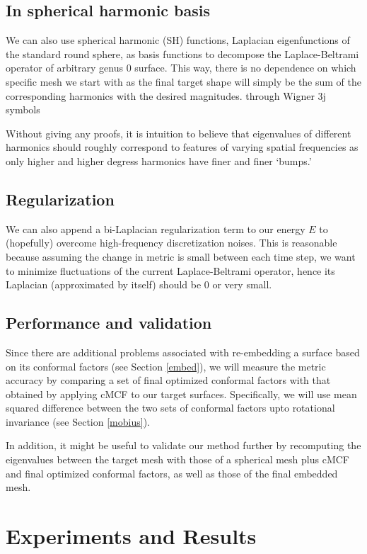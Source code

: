 \documentclass[11pt]{article}
\theoremstyle{definition}
\begin{document}
\subsection{In spherical harmonic basis}

We can also use spherical harmonic (SH) functions, Laplacian eigenfunctions of the standard round sphere, as basis functions to decompose the Laplace-Beltrami operator of arbitrary genus 0 surface. This way, there is no dependence on which specific mesh we start with as the final target shape will simply be the sum of the corresponding harmonics with the desired magnitudes. through Wigner 3j symbols 

Without giving any proofs, it is intuition to believe that eigenvalues of different harmonics should roughly correspond to features of varying spatial frequencies as only higher and higher degress harmonics have finer and finer `bumps.'

\subsection{Regularization}
We can also append a bi-Laplacian regularization term to our energy $E$ to (hopefully) overcome high-frequency discretization noises. This is reasonable because assuming the change in metric is small between each time step, we want to minimize fluctuations of the current Laplace-Beltrami operator, hence its Laplacian (approximated by itself) should be $0$ or very small.

\subsection{Performance and validation}
Since there are additional problems associated with re-embedding a surface based on its conformal factors (see Section \ref{embed}), we will measure the metric accuracy by comparing a set of final optimized conformal factors with that obtained by applying cMCF to our target surfaces. Specifically, we will use mean squared difference between the two sets of conformal factors upto rotational invariance (see Section \ref{mobius}).

In addition, it might be useful to validate our method further by recomputing the eigenvalues between the target mesh with those of a spherical mesh plus cMCF and final optimized conformal factors, as well as those of the final embedded mesh.

\section{Experiments and Results}
\end{document}
